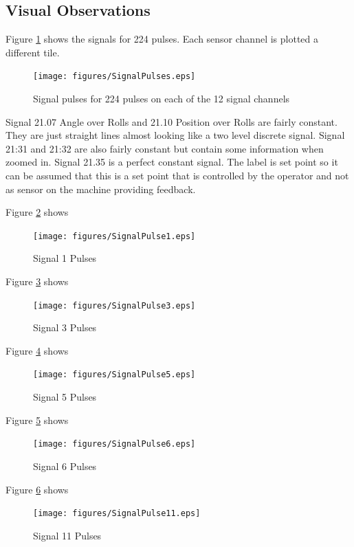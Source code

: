 \documentclass{article}
\begin{document}
\subsection{Visual Observations}
Figure \ref{fig:SignalPulses} shows the signals for 224 pulses. Each sensor channel is plotted a different tile. 
\begin{figure}[H]
    \centering
    \texttt{[image: figures/SignalPulses.eps]}
    \caption{Signal pulses for 224 pulses on each of the 12 signal channels}
    \label{fig:SignalPulses}
\end{figure}

Signal 21.07 Angle over Rolls and 21.10 Position over Rolls are fairly constant. They are just straight lines almost looking like a two level discrete signal.
Signal 21:31 and 21:32 are also fairly constant but contain some information when zoomed in.
Signal 21.35 is a perfect constant signal. The label is set point so it can be assumed that this is a set point that is controlled by the operator and not as sensor on the machine providing feedback.

Figure \ref{fig:SignalPulse1} shows 
\begin{figure}[H]
    \centering
    \texttt{[image: figures/SignalPulse1.eps]}
    \caption{Signal 1 Pulses}
    \label{fig:SignalPulse1}
\end{figure}


Figure \ref{fig:SignalPulse3} shows 
\begin{figure}[H]
    \centering
    \texttt{[image: figures/SignalPulse3.eps]}
    \caption{Signal 3 Pulses}
    \label{fig:SignalPulse3}
\end{figure}


Figure \ref{fig:SignalPulse5} shows 
\begin{figure}[H]
    \centering
    \texttt{[image: figures/SignalPulse5.eps]}
    \caption{Signal 5 Pulses}
    \label{fig:SignalPulse5}
\end{figure}


Figure \ref{fig:SignalPulse6} shows 
\begin{figure}[H]
    \centering
    \texttt{[image: figures/SignalPulse6.eps]}
    \caption{Signal 6 Pulses}
    \label{fig:SignalPulse6}
\end{figure}


Figure \ref{fig:SignalPulse11} shows 
\begin{figure}[H]
    \centering
    \texttt{[image: figures/SignalPulse11.eps]}
    \caption{Signal 11 Pulses}
    \label{fig:SignalPulse11}
\end{figure}
\end{document}
